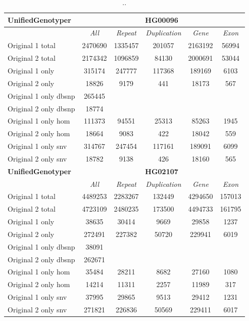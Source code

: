 \begin{table}[htb]
\begin{center}
\begin{tabular}{|l|c||c|c|c|c|}
\hline
{\bf UnifiedGenotyper} & \multicolumn{5}{|c|}{\bf HG00096} \\
\hline
\cline{2-6}
{\bf} & {\it All} & {\it Repeat} & {\it Duplication} & {\it Gene} & {\it Exon} \\
\hline
Original 1 total & 2470690 & 1335457 & 201057 & 2163192 & 56994\\ 
\hline
Original 2 total & 2174342 & 1096859 & 84130 & 2000691 & 53044\\ 
\hline
Original 1 only & 315174 & 247777 & 117368 & 189169 & 6103\\ 
\hline
Original 2 only & 18826 & 9179 & 441 & 18173 & 567\\ 
\hline
Original 1 only dbsnp & 265445 &  &  &  & \\ 
\hline
Original 2 only dbsnp & 18774 &  &  &  & \\ 
\hline
Original 1 only hom & 111373 & 94551 & 25313 & 85263 & 1945\\ 
\hline
Original 2 only hom & 18664 & 9083 & 422 & 18042 & 559\\ 
\hline
Original 1 only snv & 314767 & 247454 & 117161 & 189091 & 6099\\ 
\hline
Original 2 only snv & 18782 & 9138 & 426 & 18160 & 565\\ 
\hline
\hline
{\bf UnifiedGenotyper} & \multicolumn{5}{|c|}{\bf HG02107} \\
\hline
\cline{2-6}
{\bf} & {\it All} & {\it Repeat} & {\it Duplication} & {\it Gene} & {\it Exon} \\
\hline
Original 1 total & 4489253 & 2283267 & 132449 & 4294650 & 157013\\ 
\hline
Original 2 total & 4723109 & 2480235 & 173500 & 4494733 & 161795\\ 
\hline
Original 1 only & 38635 & 30414 & 9669 & 29858 & 1237\\ 
\hline
Original 2 only & 272491 & 227382 & 50720 & 229941 & 6019\\ 
\hline
Original 1 only dbsnp & 38091 &  &  &  & \\ 
\hline
Original 2 only dbsnp & 262671 &  &  &  & \\ 
\hline
Original 1 only hom & 35484 & 28211 & 8682 & 27160 & 1080\\ 
\hline
Original 2 only hom & 14214 & 11311 & 2257 & 11989 & 317\\ 
\hline
Original 1 only snv & 37995 & 29865 & 9513 & 29412 & 1231\\ 
\hline
Original 2 only snv & 271821 & 226836 & 50569 & 229411 & 6017\\ 
\hline
\end{tabular}
\end{center}
\caption{ .. }
\label{tab:orig-vs-shuf-ug}
\end{table}

